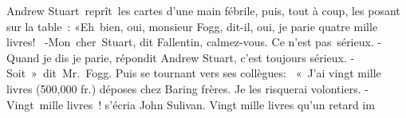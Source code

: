 \documentclass[]{book}
\begin{document}
               Andrew Stuart reprît les cartes d'une
               main fébrile, puis, tout à coup, les posant
               sur la table :
               «Eh bien, oui, monsieur Fogg, dit-il,
               oui, je parie quatre mille livres! \newline
               -Mon cher Stuart, dit Fallentin, calmez-vous. Ce n'est pas sérieux.\newline
               -Quand je dis je parie, répondit Andrew Stuart, c'est toujours sérieux.\newline
               -Soit » dit Mr. Fogg. Puis se tournant
               vers ses collègues:
                « J'ai vingt mille livres (500,000 fr.) déposes chez Baring frères. Je les risquerai
               volontiers.\newline
               -Vingt mille livres ! s'écria John Sulivan. Vingt mille livres qu'un retard im
               
\end{document}
